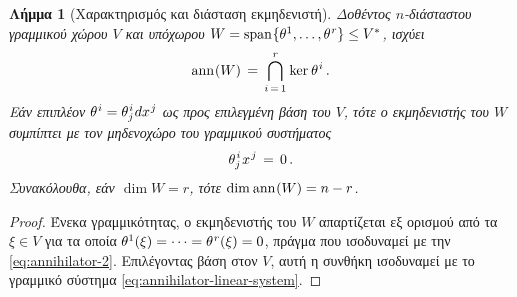 \documentclass[11pt,a4paper,twoside,openright]{book}
\newtheorem{lemma}{Λήμμα}[section]
\begin{document}
\begin{lemma}[Χαρακτηρισμός και διάσταση εκμηδενιστή]
	\label{lemma:annihilator-structure}
Δοθέντος $n$-διάσταστου γραμμικού χώρου $V$ και υπόχωρου $W = \operatorname{span}\hspace{.5pt}\{\theta^1, \dots, \theta^{\hspace{.5pt}r}\} \le V^*$, ισχύει
\begin{equation}\label{eq:annihilator-2}
\operatorname{ann}\hspace{.5pt}(W)
\,=\,
\bigcap_{i\,=\,1}^r
\hspace{.5pt}\operatorname{ker}\hspace{.5pt}\theta^{\hspace{.5pt}i}\,.
\end{equation}
Εάν επιπλέον
$\theta^{\hspace{.5pt}i} = \theta^{\hspace{.5pt}i}_j \hspace{.5pt}dx^{\hspace{.5pt}j}$ ως προς επιλεγμένη βάση του $V$, τότε ο
εκμηδενιστής του $W$
συμπίπτει με τον μηδενοχώρο του γραμμικού συστήματος
\begin{equation}\label{eq:annihilator-linear-system}
\theta^{\hspace{.75pt}i}_j\hspace{.8pt}x^{\hspace{.75pt}j} \,=\, 0\,.
\end{equation}
Συνακόλουθα, εάν $\operatorname{dim} W = r$, τότε
$\operatorname{dim}\hspace{.5pt}\operatorname{ann}\hspace{.5pt}(W) = n-r$.
\end{lemma}
\begin{proof}
Ένεκα γραμμικότητας, ο εκμηδενιστής του $W$
απαρτίζεται εξ ορισμού από τα $\xi \in V$ για τα οποία $\theta^1(\xi) = \dots = \theta^{\hspace{.5pt}r}(\xi) = 0$, πράγμα που ισοδυναμεί με την \eqref{eq:annihilator-2}. Επιλέγοντας βάση στον $V$,
αυτή η συνθήκη ισοδυναμεί με το γραμμικό σύστημα \eqref{eq:annihilator-linear-system}.
\end{proof}
\end{document}
